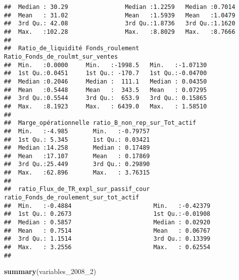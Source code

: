 \documentclass[
]{article}
\newenvironment{Shaded}{\begin{snugshade}}{\end{snugshade}}
\newcommand{\DecValTok}[1]{\textcolor[rgb]{0.00,0.00,0.81}{#1}}
\newcommand{\KeywordTok}[1]{\textcolor[rgb]{0.13,0.29,0.53}{\textbf{#1}}}
\newcommand{\NormalTok}[1]{#1}
\begin{document}
\begin{verbatim}
##  Median : 30.29                Median :1.2259   Median :0.7014         
##  Mean   : 31.02                Mean   :1.5939   Mean   :1.0479         
##  3rd Qu.: 42.08                3rd Qu.:1.8736   3rd Qu.:1.1620         
##  Max.   :102.28                Max.   :8.8029   Max.   :8.7666         
##                                                                        
##  Ratio_de_liquidité Fonds_roulement   Ratio_Fonds_de_roulmt_sur_ventes
##  Min.   :0.0000     Min.   :-1998.5   Min.   :-1.07130                
##  1st Qu.:0.0451     1st Qu.: -170.7   1st Qu.:-0.04700                
##  Median :0.2046     Median :  111.1   Median : 0.04350                
##  Mean   :0.5448     Mean   :  343.5   Mean   : 0.07295                
##  3rd Qu.:0.5544     3rd Qu.:  653.9   3rd Qu.: 0.15865                
##  Max.   :8.1923     Max.   : 6439.0   Max.   : 1.58510                
##                                                                       
##  Marge_opérationnelle ratio_B_non_rep_sur_Tot_actif
##  Min.   :-4.985       Min.   :-0.79757             
##  1st Qu.: 5.345       1st Qu.: 0.03421             
##  Median :14.258       Median : 0.17489             
##  Mean   :17.107       Mean   : 0.17869             
##  3rd Qu.:25.449       3rd Qu.: 0.29890             
##  Max.   :62.896       Max.   : 3.76315             
##                                                    
##  ratio_Flux_de_TR_expl_sur_passif_cour ratio_Fonds_de_roulement_sur_tot_actif
##  Min.   :-0.4884                       Min.   :-0.42379                      
##  1st Qu.: 0.2673                       1st Qu.:-0.01908                      
##  Median : 0.5857                       Median : 0.02920                      
##  Mean   : 0.7514                       Mean   : 0.06767                      
##  3rd Qu.: 1.1514                       3rd Qu.: 0.13399                      
##  Max.   : 3.2556                       Max.   : 0.62554                      
## 
\end{verbatim}

\begin{Shaded}
\begin{Highlighting}[]
\KeywordTok{summary}\NormalTok{(variables_}\DecValTok{2008}\NormalTok{_}\DecValTok{2}\NormalTok{)}
\end{Highlighting}
\end{Shaded}
\end{document}
